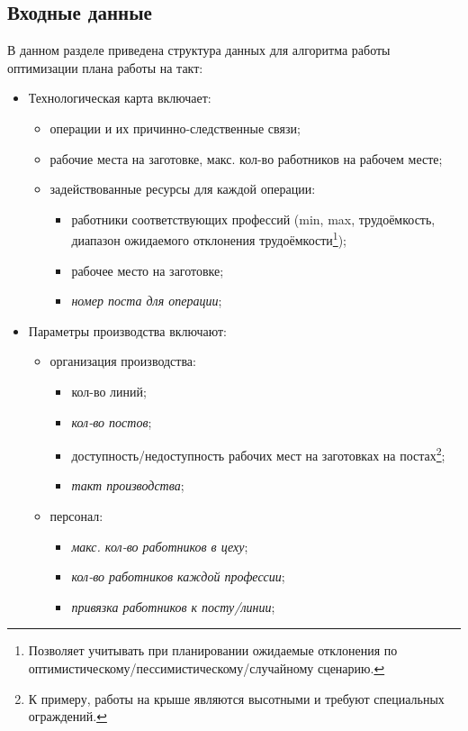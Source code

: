 \subsection{Входные данные}
В данном разделе приведена структура данных для алгоритма работы оптимизации плана работы на такт:
\label{assembly_line_balancing:input_data}
\begin{itemize}
	\item[1)] Технологическая карта включает:
		\begin{itemize}
			\item операции и их причинно-следственные связи;
			\item рабочие места на заготовке, макс. кол-во работников на рабочем месте;
			\item задействованные ресурсы для каждой операции:
				\begin{itemize}
					\item[а)] работники соответствующих профессий (min, max, трудоёмкость, диапазон ожидаемого отклонения трудоёмкости\footnote{Позволяет учитывать при планировании ожидаемые отклонения по оптимистическому/пессимистическому/случайному сценарию.});
					\item[б)] рабочее место на заготовке;
					\item[в)] \textit{номер поста для операции};
				\end{itemize}
		\end{itemize}
	\item[2)] Параметры производства включают:
		\begin{itemize}
			\item организация производства:
				\begin{itemize}
					\item[а)] кол-во линий;
					\item[б)] \textit{кол-во постов};
					\item[в)] доступность/недоступность рабочих мест на заготовках на постах\footnote{К примеру, работы на крыше являются высотными и требуют специальных ограждений.};
					\item[г)] \textit{такт производства};
				\end{itemize}
			\item персонал:
				\begin{itemize}
					\item[а)] \textit{макс. кол-во работников в цеху};
					\item[б)] \textit{кол-во работников каждой профессии};
					\item[в)] \textit{привязка работников к посту/линии};

\end{itemize}
\end{itemize}
\end{itemize}
